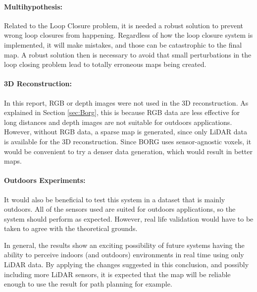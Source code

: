 \documentclass[11pt]{article}
\begin{document}
\paragraph{Multihypothesis: } Related to the Loop Closure problem, it is needed a robust solution to prevent wrong loop closures from happening. Regardless of how the loop closure system is implemented, it will make mistakes, and those can be catastrophic to the final map. A robust solution then is necessary to avoid that small perturbations in the loop closing problem lead to totally erroneous maps being created.
	
\paragraph{3D Reconstruction: } In this report, RGB or depth images were not used in the 3D reconstruction. As explained in Section \ref{sec:Borg}, this is because RGB data are less effective for long distances and depth images are not suitable for outdoors applications. However, without RGB data, a sparse map is generated, since only LiDAR data is available for the 3D reconstruction. Since BORG uses sensor-agnostic voxels, it would be convenient to try a denser data generation, which would result in better maps.
	
\paragraph{Outdoors Experiments: } It would also be beneficial to test this system in a dataset that is mainly outdoors. All of the sensors used are suited for outdoors applications, so the system should perform as expected. However, real life validation would have to be taken to agree with the theoretical grounds.

In general, the results show an exciting possibility of future systems having the ability to perceive indoors (and outdoors) environments in real time using only LiDAR data. By applying the changes suggested in this conclusion, and possibly including more LiDAR sensors, it is expected that the map will be reliable enough to use the result for path planning for example.
\end{document}
